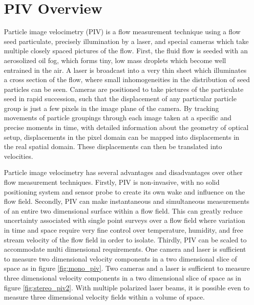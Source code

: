 \section{PIV Overview}

Particle image velocimetry (PIV) is a flow measurement technique using a flow 
seed particulate, precisely illumination by a laser, and special cameras which 
take multiple closely spaced pictures of the flow. First, the fluid flow is 
seeded with an aerosolized oil fog, which forms tiny, low mass droplets which 
become well entrained in the air. A laser is broadcast into a very thin sheet 
which illuminates a cross section of the flow, where small inhomogeneities in 
the distribution of seed particles can be seen. Cameras are positioned to take 
pictures of the particulate seed in rapid succession, such that the 
displacement of any particular particle group is just a few pixels in the image 
plane of the camera. By tracking movements of particle groupings through each 
image taken at a specific and precise moments in time, with detailed 
information about the geometry of optical setup, displacements in the pixel 
domain can be mapped into displacements in the real spatial domain. These 
displacements can then be translated into velocities.

Particle image velocimetry has several advantages and disadvantages over other 
flow measurement techniques. Firstly, PIV is non-invasive, with no solid 
positioning system and sensor probe to create its own wake and influence on the 
flow field. Secondly, PIV can make instantaneous and simultaneous measurements 
of an entire two dimensional surface within a flow field. This can greatly 
reduce uncertainty associated with single point surveys over a flow field where 
variation in time and space require very fine control over temperature, 
humidity, and free stream velocity of the flow field in order to isolate. 
Thirdly, PIV can be scaled to accommodate multi dimensional requirements. One 
camera and laser is sufficient to measure two dimensional velocity 
components in a two dimensional slice of space as in figure \ref{fig:mono_piv}. 
Two cameras and a laser is sufficient to measure three dimensional velocity
components in a two dimensional slice of space as in figure
\ref{fig:stereo_piv2}. With multiple polarized laser beams, it is possible even
to measure three dimensional velocity fields within a volume of space. 

